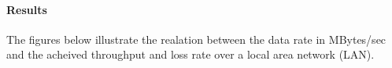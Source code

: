 \documentclass[aps,letterpaper,10pt]{revtex4}
\begin{document}
            \paragraph{Results}
                The figures below illustrate the realation between the data rate in MBytes/sec and the acheived throughput and loss rate over a local area network (LAN).
                \begin{figure}[htp]
                    \begin{center}
                \end{center}    
            \end{figure}
\end{document}
